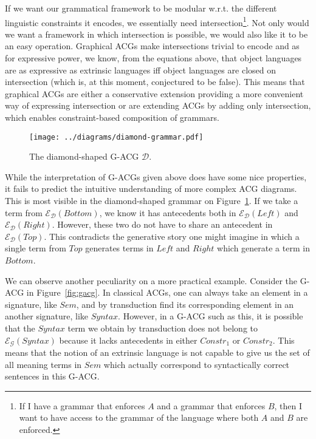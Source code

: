 \documentclass{llncs}
\begin{document}
If we want our grammatical framework to be modular w.r.t. the different
linguistic constraints it encodes, we essentially need
intersection\footnote{If I have a grammar that enforces $A$ and a grammar that
  enforces $B$, then I want to have access to the grammar of the language
  where both $A$ and $B$ are enforced.}. Not only would we want a framework in
which intersection is possible, we would also like it to be an easy
operation. Graphical ACGs make intersections trivial to encode and as for
expressive power, we know, from the equations above, that object languages are
as expressive as extrinsic languages iff object languages are closed on
intersection (which is, at this moment, conjectured to be false). This means
that graphical ACGs are either a conservative extension providing a more
convenient way of expressing intersection or are extending ACGs by adding
only intersection, which enables constraint-based composition of grammars. 

\begin{figure}
  \centering
  \texttt{[image: ../diagrams/diamond-grammar.pdf]}
  \caption{\label{fig:diamond} The diamond-shaped G-ACG $\mathcal{D}$.}
\end{figure}

While the interpretation of G-ACGs given above does have some nice properties,
it fails to predict the intuitive understanding of more complex ACG
diagrams. This is most visible in the diamond-shaped grammar on
Figure~\ref{fig:diamond}. If we take a term from
$\mathcal{E}_{\mathcal{D}}(Bottom)$, we know it has antecedents both in
$\mathcal{E}_{\mathcal{D}}(Left)$ and
$\mathcal{E}_{\mathcal{D}}(Right)$. However, these two do not have to share an
antecedent in $\mathcal{E}_{\mathcal{D}}(Top)$. This contradicts the
generative story one might imagine in which a single term from $Top$ generates
terms in $Left$ and $Right$ which generate a term in $Bottom$.

We can observe another peculiarity on a more practical example. Consider the
G-ACG in Figure~\ref{fig:gacg}. In classical ACGs, one can always take an
element in a signature, like $Sem$, and by transduction find its corresponding
element in an another signature, like $Syntax$. However, in a G-ACG such as
this, it is possible that the $Syntax$ term we obtain by transduction does not
belong to $\mathcal{E}_{\mathcal{G}}(Syntax)$ because it lacks antecedents in
either $Constr_1$ or $Constr_2$. This means that the notion of an extrinsic
language is not capable to give us the set of all meaning terms in $Sem$ which
actually correspond to syntactically correct sentences in this G-ACG.
\end{document}
